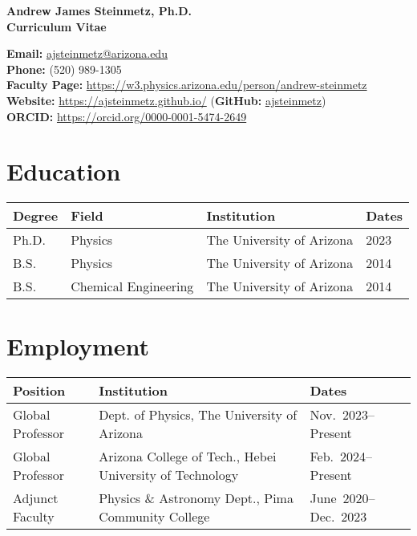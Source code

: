 \documentclass[11pt]{article}
\begin{document}
\begin{center}
    {\Large\textbf{Andrew James Steinmetz, Ph.D.}}\\[0.5em]
    {\large\textbf{Curriculum Vitae}}
\end{center}

\noindent
\textbf{Email:} \href{mailto:ajsteinmetz@arizona.edu}{ajsteinmetz@arizona.edu}\\[0.3em]
\textbf{Phone:} (520) 989-1305\\[0.3em]
\textbf{Faculty Page:} \href{https://w3.physics.arizona.edu/person/andrew-steinmetz}{https://w3.physics.arizona.edu/person/andrew-steinmetz}\\[0.3em]
\textbf{Website:} \href{https://ajsteinmetz.github.io/}{https://ajsteinmetz.github.io/} (\textbf{GitHub:} \href{https://github.com/ajsteinmetz/}{ajsteinmetz})\\[0.3em]
\textbf{ORCID:} \href{https://orcid.org/0000-0001-5474-2649}{https://orcid.org/0000-0001-5474-2649}

\section*{Education}
{\normalsize
\begin{tabular}{@{}p{2.8cm} p{4.0cm} p{5.0cm} p{3.2cm}@{}}
\toprule
\textbf{Degree} & \textbf{Field} & \textbf{Institution} & \textbf{Dates} \\
\midrule
Ph.D. & Physics             & The University of Arizona & 2023 \\
B.S.   & Physics             & The University of Arizona & 2014 \\
B.S.   & Chemical Engineering& The University of Arizona & 2014 \\
\bottomrule
\end{tabular}
}

\section*{Employment}
{\normalsize
\begin{tabular}{@{}p{2.8cm} p{9.5cm} p{3.2cm}@{}}
\toprule
\textbf{Position} & \textbf{Institution} & \textbf{Dates} \\
\midrule
Global Professor   & Dept. of Physics, The University of Arizona            & {\footnotesize Nov.~2023--Present} \\
Global Professor   & Arizona College of Tech., Hebei University of Technology       & {\footnotesize Feb.~2024--Present} \\
Adjunct Faculty    & Physics \& Astronomy Dept., Pima Community College               & {\footnotesize June~2020--Dec.~2023} \\
\bottomrule
\end{tabular}
}
\end{document}
